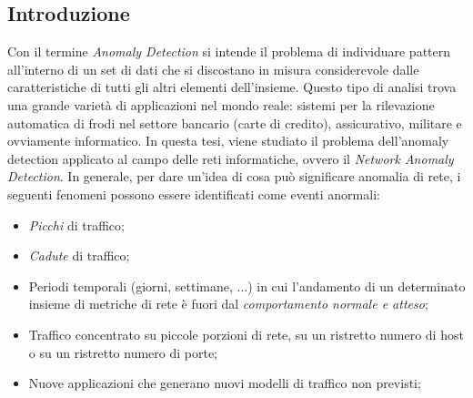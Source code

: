 \documentclass[12pt,a4paper,cucitura]{toptesi}
\begin{document}
\subsection{Introduzione}
Con il termine \emph{Anomaly Detection} si intende il problema di individuare pattern all'interno di un set di dati che si discostano in misura considerevole dalle caratteristiche di tutti gli
altri elementi dell'insieme. 
Questo tipo di analisi trova una grande varietà di applicazioni
nel mondo reale: sistemi per la rilevazione automatica di frodi nel settore bancario (carte di credito), assicurativo, militare e ovviamente informatico.
In questa tesi, viene studiato il problema dell'anomaly detection applicato al campo delle reti informatiche, ovvero il \emph{Network Anomaly Detection}.
In generale, per dare un'idea di cosa può significare anomalia di rete, i seguenti fenomeni possono essere identificati come eventi anormali:

\begin{itemize}
\item \emph{Picchi} di traffico;
\item \emph{Cadute} di traffico;
\item Periodi temporali (giorni, settimane, ...) in cui l'andamento di un determinato insieme di metriche di rete è fuori dal \emph{comportamento normale e atteso};
\item Traffico concentrato su piccole porzioni di rete, su un ristretto numero di host o su un ristretto numero di porte;
\item Nuove applicazioni che generano nuovi modelli di traffico non previsti;
\end{itemize}
\end{document}
